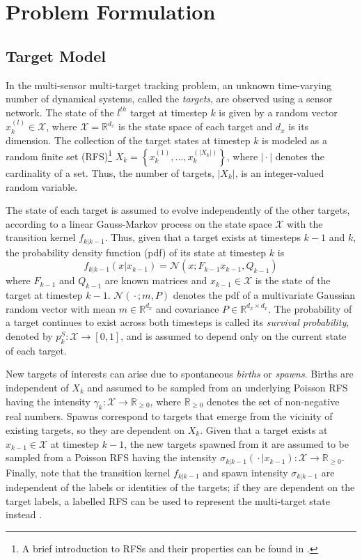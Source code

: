 \section{Problem Formulation}
\label{sec:prob_form}
\subsection{Target Model}
In the multi-sensor multi-target tracking problem, an unknown time-varying number of dynamical systems, called the \textit{targets}, are observed using a sensor network.
The state of the $l^{th}$ target at timestep $k$ is given by a random vector $x_{k}^{(l)} \in \mathcal{X}$, where $\mathcal{X} = \mathbb{R}^{d_x}$ is the state space of each target and $d_x$ is its dimension. The collection of the target states at timestep $k$ is modeled as a random finite set (RFS)\footnote{A brief introduction to RFSs and their properties can be found in \cite{vo2006gmphd}.} $X_k = \left\{x_{k}^{(1)},...,x_{k}^{(|X_k|)}\right\}$, where $|{}\cdot{}|$ denotes the cardinality of a set.
Thus, the number of targets, $|X_k|$, is an integer-valued random variable.

The state of each target is assumed to evolve independently of the other targets, according to a linear Gauss-Markov process on the state space $\mathcal{X}$ with the transition kernel $f_{k|k-1}$. Thus, given that a target exists at timesteps $k-1$ and $k$, the probability density function (pdf) of its state at timestep $k$ is
\begin{equation}
    f_{k|k-1}(x | x_{k-1}) = 
    \mathcal{N}(x; F_{k-1} x_{k-1}, Q_{k-1})
    \label{eq:dynamic_model}
\end{equation}
where $F_{k-1}$ and $Q_{k-1}$ are known matrices and $x_{k-1} \in\mathcal X$ is the state of the target at timestep $k-1$. 
$\mathcal{N}({}\cdot{}; m, P)$ denotes the pdf of a multivariate Gaussian random vector with mean $m\in \mathbb R^{d_x}$ and covariance $P\in \mathbb R^{d_x\times d_x}$. 
The probability of a target continues to exist across both timesteps is called its \textit{survival probability}, denoted by $p^S_{k}:\mathcal X \rightarrow [0, 1]$, and is assumed to depend only on the current state of each target.

New targets of interests can arise due to spontaneous \textit{births} or \textit{spawns}. Births are independent of $X_k$ and assumed to be sampled from an underlying Poisson RFS having the intensity $\gamma _k:\mathcal X \rightarrow \mathbb R_{\geq0}$, where $\mathbb R_{\geq0}$ denotes the set of non-negative real numbers. 
Spawns correspond to targets that emerge from the vicinity of existing targets, so they are dependent on $X_k$. Given that a target exists at $x_{k-1} \in \mathcal X$ at timestep $k-1$, the new targets spawned from it are assumed to be sampled from
a Poisson RFS having the intensity $\sigma _{k|k-1}({}\cdot{}|x_{k-1}):\mathcal X \rightarrow \mathbb R_{\geq 0}$. Finally, note that the transition kernel $f_{k|k-1}$ and spawn intensity $\sigma_{k|k-1}$ are independent of the labels or identities of the targets; if they are dependent on the target labels, a labelled RFS can be used to represent the multi-target state instead \cite{vo2014labeled}.

